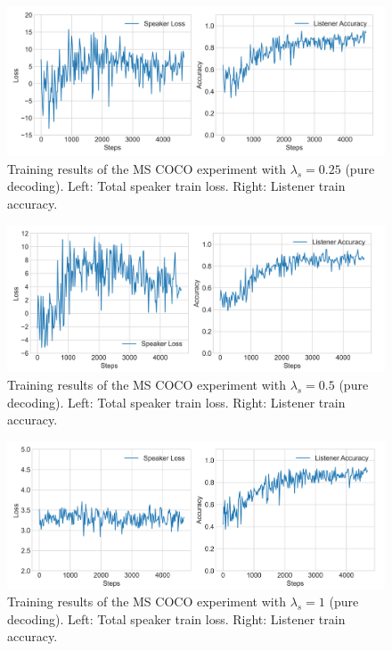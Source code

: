 \begin{figure}
	\centering
	\includegraphics[width=\linewidth]{images/coco_refgame_4000_pure_025_random.png}
	\caption{Training results of the MS COCO experiment with $\lambda_s = 0.25$ (pure decoding). Left: Total speaker train loss. Right: Listener train accuracy.}
	\label{fig:coco_baseline_025_speaker_loss_listener_acc}
\end{figure}

\begin{figure}
	\centering
	\includegraphics[width=\linewidth]{images/coco_refgame_4000_pure_05_random.png}
	\caption{Training results of the MS COCO experiment with $\lambda_s = 0.5$ (pure decoding). Left: Total speaker train loss. Right: Listener train accuracy.}
	\label{fig:coco_baseline_05_speaker_loss_listener_acc}
\end{figure}

\begin{figure}
	\centering
	\includegraphics[width=\linewidth]{images/coco_refgame_4000_pure_1_random.png}
	\caption{Training results of the MS COCO experiment with $\lambda_s = 1$ (pure decoding). Left: Total speaker train loss. Right: Listener train accuracy.}
	\label{fig:coco_baseline_1_speaker_loss_listener_acc}
\end{figure}


